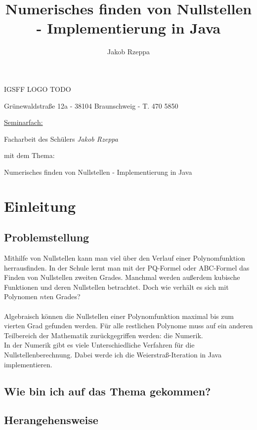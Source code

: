\documentclass[12pt]{article}
\title{Numerisches finden von Nullstellen - Implementierung in Java}
\author{Jakob Rzeppa}
\begin{document}
\begin{titlepage}
	\centering
    {\huge IGSFF LOGO TODO\par}
	{Grünewaldstraße 12a - 38104 Braunschweig - T. 470 5850\par}
	\vspace{1cm}
	{\underline{Seminarfach:}\par}
	\vspace{1cm}
    {\large Facharbeit des Schülers \textit{Jakob Rzeppa} \par mit dem Thema: \par}
    \vspace{1.5cm}
	{\huge Numerisches finden von Nullstellen - Implementierung in Java\par}
	\vspace{2cm}
\end{titlepage}

\tableofcontents

\section{Einleitung}

\subsection{Problemstellung}
Mithilfe von Nullstellen kann man viel über den Verlauf einer Polynomfunktion herrausfinden. In der Schule lernt man mit der PQ-Formel oder ABC-Formel das Finden von Nullstellen zweiten Grades. Manchmal werden außerdem kubische Funktionen und deren Nullstellen betrachtet. Doch wie verhält es sich mit Polynomen $n$ten Grades?\\
\\
Algebraisch können die Nullstellen einer Polynomfunktion maximal bis zum vierten Grad gefunden werden. Für alle restlichen Polynome muss auf ein anderen Teilbereich der Mathematik zurückgegriffen werden: die Numerik.\\
In der Numerik gibt es viele Unterschiedliche Verfahren für die Nullstellenberechnung. Dabei werde ich die Weierstraß-Iteration in Java implementieren.

\subsection{Wie bin ich auf das Thema gekommen?}

\subsection{Herangehensweise}
\end{document}
